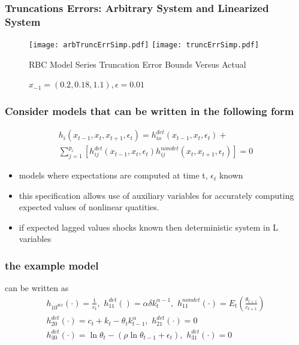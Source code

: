 \documentclass[tikz]{beamer}
\begin{document}
  \begin{frame}
    \frametitle{Truncations Errors: Arbitrary System and Linearized System}


\begin{figure}[H]
  \centering
\texttt{[image: arbTruncErrSimp.pdf]}  
\texttt{[image: truncErrSimp.pdf]}  
\caption{RBC Model Series Truncation Error Bounds Versus Actual}
  \caption{ $x_{-1}=( {{0.2}, {0.18}, {1.1}}), \epsilon=0.01$} \label{arbFig}
\end{figure}


  \end{frame}





\begin{frame}
\frametitle{Consider  models that can be written in  the following form}


\begin{gather}
  h_i(x_{t-1},x_{t},x_{t+1},\epsilon_t)=h^{det}_{io}(x_{t-1},x_{t},\epsilon_t)+\\ \sum_{j=1}^{p_i} [h^{det}_{ij}(x_{t-1},x_{t},\epsilon_t)h^{nondet}_{ij}(x_{t},x_{t+1},\epsilon_t)]=0
\end{gather}

\begin{itemize}
\item models where expectations are computed at time t, $\epsilon_t$  known
\item this specification allows use of auxiliary variables for 
accurately computing expected values of nonlinear quatities.
\item if expected lagged values shocks known then deterministic system in L variables
\end{itemize}

\end{frame}


\begin{frame}
\frametitle{the example  model }
\label{sec:simple-rbc-model-ext} can be written as
\begin{gather}
h_{10^{det}}(\cdot)=\frac{1}{c_t},\,\,
h_{11}^{det}()=\alpha \delta k_{t}^{\alpha-1} ,\,\,
h_{11}^{nondet}(\cdot)=E_t \left (\frac{\theta_{t+1}}{c_{t+1}} \right )\\
h_{20}^{det}(\cdot)=c_t + k_t-\theta_tk_{t-1}^\alpha,\,\,
h_{21}^{det}(\cdot)=0\\
h_{30}^{det}(\cdot)=\ln \theta_t -(\rho \ln \theta_{t-1} + \epsilon_t),\,\,
h_{31}^{det}(\cdot)=0
\end{gather}

\end{frame}
\end{document}
